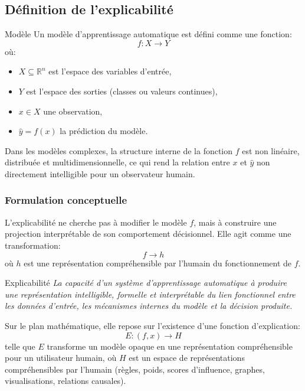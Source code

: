 \vspace{8pt}

\subsection{Définition de l’explicabilité}

\begin{definition}{Modèle}
Un modèle d’apprentissage automatique est défini comme une fonction:
\[
f : X \rightarrow Y
\]
où:
\begin{itemize}
    \item $X \subseteq \mathbb{R}^n$ est l’espace des variables d’entrée,
    \item $Y$ est l’espace des sorties (classes ou valeurs continues),
    \item $x \in X$ une observation,
    \item $\hat{y} = f(x)$ la prédiction du modèle.
\end{itemize}
\end{definition}

Dans les modèles complexes, la structure interne de la fonction $f$ est non linéaire, distribuée et multidimensionnelle, ce qui rend la relation entre $x$ et $\hat{y}$ non directement intelligible pour un observateur humain.

\subsubsection{Formulation conceptuelle}

L’explicabilité ne cherche pas à modifier le modèle $f$, mais à construire une projection interprétable de son comportement décisionnel. Elle agit comme une transformation:
\[
f \longrightarrow h
\]
où $h$ est une représentation compréhensible par l’humain du fonctionnement de $f$.

\begin{definition}{Explicabilité}
\textit{La capacité d’un système d’apprentissage automatique à produire une représentation intelligible, formelle et interprétable du lien fonctionnel entre les données d’entrée, les mécanismes internes du modèle et la décision produite.}

Sur le plan mathématique, elle repose sur l’existence d’une fonction d’explication:
\[
E : (f, x) \rightarrow H
\]
telle que $E$ transforme un modèle opaque en une représentation compréhensible pour un utilisateur humain, où $H$ est un espace de représentations compréhensibles par l’humain (règles, poids, scores d’influence, graphes, visualisations, relations causales).
\end{definition}

